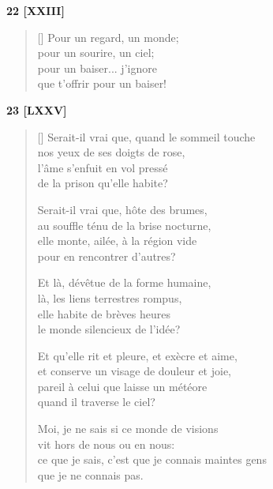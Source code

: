 \documentclass[a4paper,12pt]{book}
\begin{document}
\bigskip

\begin{center}
  \textbf{22 [XXIII]}
\end{center}

\settowidth{\versewidth}{que t'offrir pour un baiser!}

\begin{verse}[\versewidth]
  Pour un regard, un monde; \\
  pour un sourire, un ciel; \\
  pour un baiser... j'ignore \\
  que t'offrir pour un baiser!
\end{verse}

\bigskip

\begin{center}
  \textbf{23 [LXXV]}
\end{center}

\settowidth{\versewidth}{ce que je sais, c'est que je connais maintes gens}

\begin{verse}[\versewidth]
  Serait-il vrai que, quand le sommeil touche \\
  nos yeux de ses doigts de rose, \\
  l'âme s'enfuit en vol pressé \\
  de la prison qu'elle habite?

  Serait-il vrai que, hôte des brumes, \\
  au souffle ténu de la brise nocturne, \\
  elle monte, ailée, à la région vide \\
  pour en rencontrer d'autres?

  Et là, dévêtue de la forme humaine, \\
  là, les liens terrestres rompus, \\
  elle habite de brèves heures \\
  le monde silencieux de l'idée?

  Et qu'elle rit et pleure, et exècre et aime, \\
  et conserve un visage de douleur et joie, \\
  pareil à celui que laisse un météore \\
  quand il traverse le ciel?

  Moi, je ne sais si ce monde de visions \\
  vit hors de nous ou en nous: \\
  ce que je sais, c'est que je connais maintes gens \\
  que je ne connais pas.
\end{verse}
\end{document}
